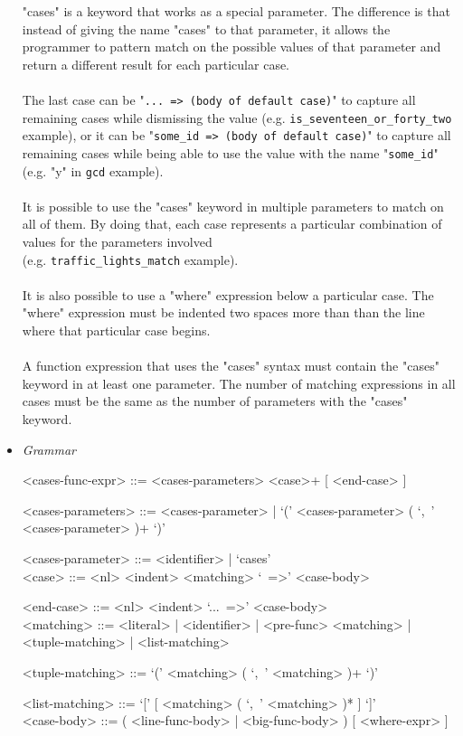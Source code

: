 \documentclass{article}
\begin{document}
\begin{itemize}
"cases" is a keyword that works as a special parameter. The difference is that
instead of giving the name "cases" to that parameter, it allows the programmer
to pattern match on the possible values of that parameter and return a
different result for each particular case. 
\\\\
The last case can be "\texttt{... => (body of default case)}" to capture all
remaining cases while dismissing the value (e.g.
\texttt{is_seventeen_or_forty_two} example), or it can be
"\texttt{some_id => (body of default case)}" to capture all remaining
cases while being able to use the value with the name "\texttt{some_id}"
(e.g.  "y" in \texttt{gcd} example).
\\\\
It is possible to use the "cases" keyword in multiple parameters to match on all
of them. By doing that, each case represents a particular combination of values
for the parameters involved\\(e.g. \texttt{traffic_lights_match} example).
\\\\
It is also possible to use a "where" expression below a particular case. The
"where" expression must be indented two spaces more than than the line where
that particular case begins.
\\\\
A function expression that uses the "cases" syntax must contain the "cases"
keyword in at least one parameter. The number of matching expressions in 
all cases must be the same as the number of parameters with the "cases" keyword.

\item \textit{Grammar}
\begin{grammar}
<cases-func-expr> ::= <cases-parameters> <case>+ [ <end-case> ]

<cases-parameters> ::=
<cases-parameter> | `(' <cases-parameter> ( `,\ ' <cases-parameter> )+ `)'

<cases-parameter> ::= <identifier> | `cases'
\\

<case> ::=  <nl> <indent> <matching> `\ =>' <case-body>

<end-case> ::= <nl> <indent> `...\ =>' <case-body>
\\

<matching> ::= 
<literal> | <identifier> | <pre-func> <matching> | <tuple-matching> |
<list-matching>

<tuple-matching> ::= `(' <matching> ( `,\ ' <matching> )+ `)'

<list-matching> ::= `[' [ <matching> ( `,\ ' <matching> )* ] `]'
\\

<case-body> ::= ( <line-func-body> | <big-func-body> ) [ <where-expr> ]
\end{grammar}

\end{itemize}
\end{document}
